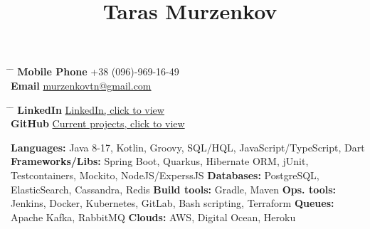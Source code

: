 \documentclass[10pt]{article} %
\begin{document}


\title{Taras Murzenkov } %


\parbox{0.2\textwidth}{ %
\begin{tabbing} %
\hspace{3cm} \= \hspace{4cm} \= \kill %
{\bf Mobile Phone} \>+38 (096)-969-16-49\\ %
{\bf Email} \> \href{mailto:murzenkovtn@gmail.com}{murzenkovtn@gmail.com} \\ %
\end{tabbing}}
\hfill %
\parbox{0.5\textwidth}{ %
\begin{tabbing} %
\hspace{3cm} \= \hspace{4cm} \= \kill %
{\bf LinkedIn} \> \href{https://www.linkedin.com/in/tarasmurzenkov}{LinkedIn, click to view} \\ %
{\bf GitHub} \> \href{https://github.com/tarasmurzenkovv/}{Current projects, click to view}\\ %

\end{tabbing}}

{
\textbf{Languages:} Java 8-17, Kotlin, Groovy, SQL/HQL, JavaScript/TypeScript, Dart\newline
\textbf{Frameworks/Libs:} Spring Boot, Quarkus, Hibernate ORM, jUnit, Testcontainers, Mockito, NodeJS/ExperssJS \newline
\textbf{Databases:}  PostgreSQL, ElasticSearch, Cassandra, Redis \newline
\textbf{Build tools:} Gradle, Maven \newline
\textbf{Ops. tools:} Jenkins, Docker, Kubernetes, GitLab, Bash scripting, Terraform \newline
\textbf{Queues:} Apache Kafka, RabbitMQ \newline
\textbf{Clouds:} AWS, Digital Ocean, Heroku
}
\end{document}
